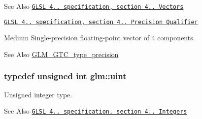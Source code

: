 \begin{DoxySeeAlso}{See Also}
\href{http://www.opengl.org/registry/doc/GLSLangSpec.4.20.8.pdf}{\tt G\-L\-S\-L 4.. specification, section 4.. Vectors} 

\href{http://www.opengl.org/registry/doc/GLSLangSpec.4.20.8.pdf}{\tt G\-L\-S\-L 4.. specification, section 4.. Precision Qualifier}
\end{DoxySeeAlso}
Medium Single-\/precision floating-\/point vector of 4 components. \begin{DoxySeeAlso}{See Also}
\hyperlink{group__gtc__type__precision}{G\-L\-M\-\_\-\-G\-T\-C\-\_\-type\-\_\-precision} 
\end{DoxySeeAlso}
\hypertarget{group__core__precision_ga4fd29415871152bfb5abd588334147c8}{
\subsubsection[{uint}]{\setlength{\rightskip}{0pt plus 5cm}typedef unsigned int {\bf glm\-::uint}}}\label{group__core__precision_ga4fd29415871152bfb5abd588334147c8}
Unsigned integer type.

\begin{DoxySeeAlso}{See Also}
\href{http://www.opengl.org/registry/doc/GLSLangSpec.4.20.8.pdf}{\tt G\-L\-S\-L 4.. specification, section 4.. Integers} 
\end{DoxySeeAlso}

